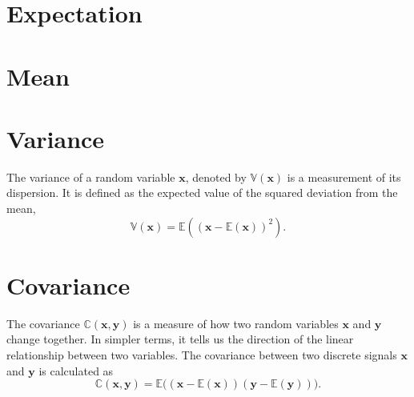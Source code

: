 \section{Expectation}

\section{Mean}

\section{Variance}
\label{sec:variance}

The variance of a random variable $\mathbf{x}$, denoted by
$\mathbb{V}(\mathbf{x})$ is a measurement of its dispersion. It is
defined as the expected value of the squared deviation from the mean,
\begin{equation}
  \mathbb{V}(\mathbf{x}) = \mathbb{E}\left((\mathbf{x} - \mathbb{E}(\mathbf{x}))^2 \right).
  \label{eq:variance}
\end{equation}


\section{Covariance}
\label{sec:covariance}

The covariance $\mathbb{C}(\mathbf{x}, \mathbf{y})$ is a measure of
how two random variables $\mathbf{x}$ and $\mathbf{y}$ change
together. In simpler terms, it tells us the direction of the linear
relationship between two variables. The covariance between two
discrete signals $\mathbf{x}$ and $\mathbf{y}$ is calculated as
\begin{equation}
  \mathbb{C}(\textbf{x}, \textbf{y}) = \mathbb{E}\big((\mathbf{x}-\mathbb{E}(\mathbf{x}))(\mathbf{y}-\mathbb{E}(\mathbf{y}))\big).
\end{equation}

